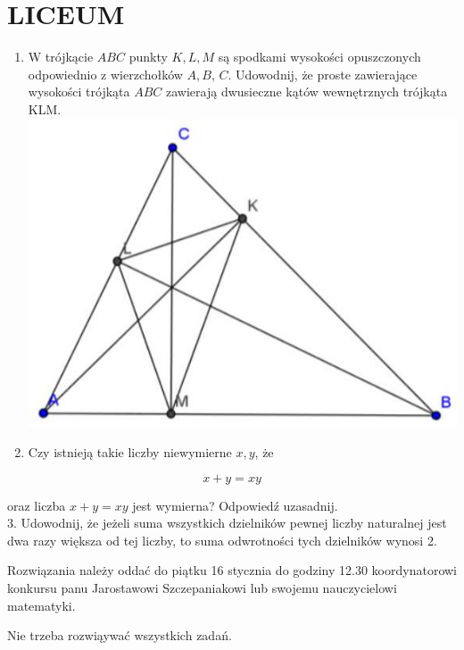 \documentclass[10pt]{article}
\begin{document}
\section*{LICEUM}
\begin{enumerate}
  \item W trójkącie \(A B C\) punkty \(K, L, M\) są spodkami wysokości opuszczonych odpowiednio z wierzchołków \(A, B\), \(C\). Udowodnij, że proste zawierające wysokości trójkąta \(A B C\) zawierają dwusieczne kątów wewnętrznych trójkąta KLM.\\
\includegraphics[max width=\textwidth, center]{2024_11_21_ba1800e73998f6feb233g-1}
  \item Czy istnieją takie liczby niewymierne \(x, y\), że
\end{enumerate}

\[
x+y=x y
\]

oraz liczba \(x+y=x y\) jest wymierna? Odpowiedź uzasadnij.\\
3. Udowodnij, że jeżeli suma wszystkich dzielników pewnej liczby naturalnej jest dwa razy większa od tej liczby, to suma odwrotności tych dzielników wynosi 2.

Rozwiązania należy oddać do piątku 16 stycznia do godziny 12.30 koordynatorowi konkursu panu Jarostawowi Szczepaniakowi lub swojemu nauczycielowi matematyki.

Nie trzeba rozwiąywać wszystkich zadań.
\end{document}
